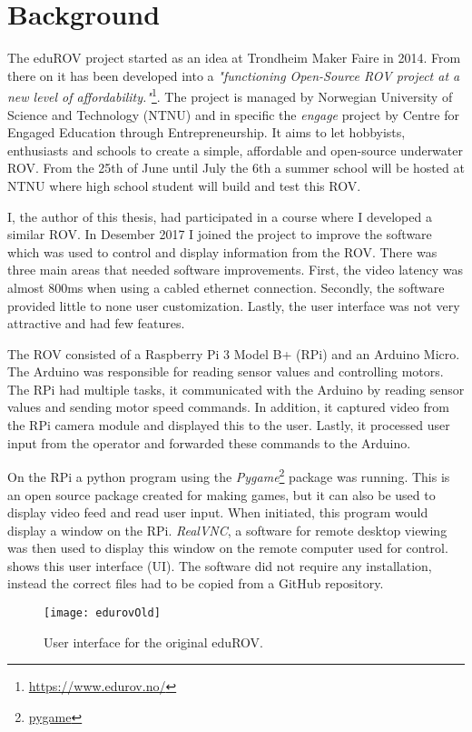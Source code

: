 \section{Background}

The eduROV project started as an idea at Trondheim Maker Faire in 2014. From there on it has been developed into a \emph{"functioning Open-Source ROV project at a new level of affordability."}\footnote{\url{https://www.edurov.no/}}. The project is managed by Norwegian University of Science and Technology (NTNU) and in specific the \emph{engage} project by Centre for Engaged Education through Entrepreneurship. It aims to let hobbyists, enthusiasts and schools to create a simple, affordable and open-source underwater ROV. From the 25th of June until July the 6th a summer school will be hosted at NTNU where high school student will build and test this ROV.

I, the author of this thesis, had participated in a course where I developed a similar ROV. In Desember 2017 I joined the project to improve the software which was used to control and display information from the ROV. There was three main areas that needed software improvements. First, the video latency was almost 800ms when using a cabled ethernet connection. Secondly, the software provided little to none user customization. Lastly, the user interface was not very attractive and had few features.

The ROV consisted of a Raspberry Pi 3 Model B+ (RPi) and an Arduino Micro. The Arduino was responsible for reading sensor values and controlling motors. The RPi had multiple tasks, it communicated with the Arduino by reading sensor values and sending motor speed commands. In addition, it captured video from the RPi camera module and displayed this to the user. Lastly, it processed user input from the operator and forwarded these commands to the Arduino.

On the RPi a python program using the \emph{Pygame}\footnote{\url{pygame}} package was running. This is an open source package created for making games, but it can also be used to display video feed and read user input. When initiated, this program would display a window on the RPi. \emph{RealVNC}, a software for remote desktop viewing was then used to display this window on the remote computer used for control.  shows this user interface (UI). The software did not require any installation, instead the correct files had to be copied from a GitHub repository.

\begin{figure}[h!]
    \centering
    \texttt{[image: edurovOld]}
    \caption{User interface for the original eduROV.}
    \label{edurovOld}
\end{figure}

